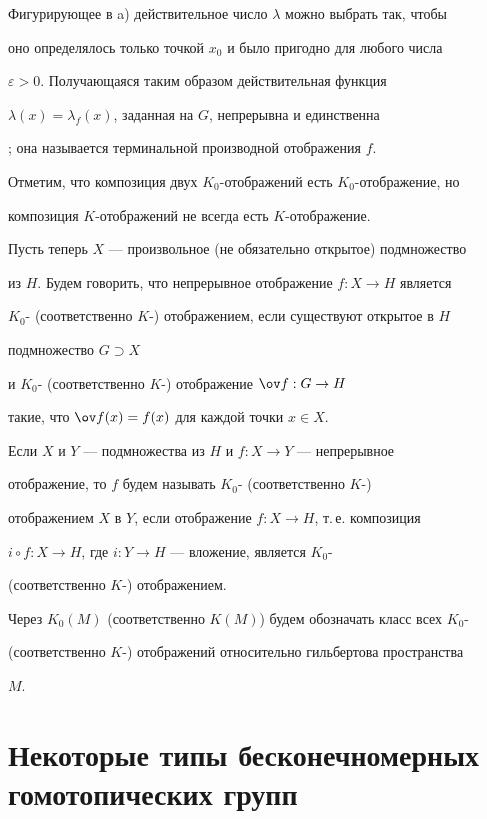  


Фигурирующее в a) действительное число $\lambda$ можно выбрать так, чтобы 


оно определялось только точкой $x_0$ и было пригодно для любого числа 


$\varepsilon>0$. Получающаяся таким образом действительная функция 


$\lambda(x)=\lambda_f(x)$, заданная на $G$, непрерывна и единственна 


\cite{6}; она называется терминальной производной отображения $f$. 


Отметим, что композиция двух $K_0$-отображений есть $K_0$-отображение, но 


композиция $K$-отображений не всегда есть $K$-отображение. 


 


Пусть теперь $X$ --- произвольное (не обязательно открытое) подмножество 


из $H$. Будем говорить, что непрерывное отображение $f:X\to H$ является 


$K_0$- (соответственно $K$-) отображением, если существуют открытое в $H$ 


подмножество $G\supset X$


и $K_0$- (соответственно $K$-) отображение $\ov f:G\to H$ 


такие, что $\ov f(x)=f(x)$ для каждой точки $x\in X$. 


 


Если $X$ и $Y$ --- подмножества из $H$ и $f:X\to Y$ --- непрерывное 


отображение, то $f$ будем называть $K_0$- (соответственно $K$-) 


отображением $X$ в $Y$, если отображение $f:X\to H$, т.\,е. композиция 


$i\circ f:X\to H$, где $i:Y\to H$ --- вложение, является $K_0$- 


(соответственно $K$-) отображением. 


 


Через $K_0(M)$ (соответственно $K(M)$) будем обозначать класс всех $K_0$- 


(соответственно $K$-) отображений относительно гильбертова пространства 


$M$. 


 


\section{Некоторые типы бесконечномерных гомотопических групп} 


